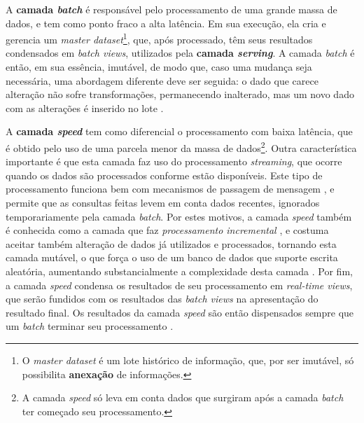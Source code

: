 A \textbf{camada \textit{batch}} é responsável pelo processamento de uma grande
massa de dados, e tem como ponto fraco a alta latência. Em sua execução, ela
cria e gerencia um \textit{master dataset}\footnote{O \textit{master dataset} é um lote
histórico de informação, que, por ser imutável, só possibilita \textbf{anexação}
de informações.}, que, após processado, têm seus resultados condensados em
\textit{batch views}, utilizados pela \textbf{camada \textit{serving}}.
A camada \textit{batch} é então, em sua essência, imutável, de modo que, caso
uma mudança seja necessária, uma abordagem diferente deve ser seguida: o dado
que carece alteração não sofre transformações, permanecendo inalterado, mas um
novo dado com as alterações é inserido no lote \cite{marz2015}.

A \textbf{camada \textit{speed}} tem como diferencial o processamento com baixa
latência, que é obtido pelo uso de uma parcela menor da massa de dados\footnote{
A camada \textit{speed} só leva em conta dados que surgiram após a camada
\textit{batch} ter começado seu processamento.}. Outra característica importante
é que esta camada faz uso do processamento \textit{streaming}, que ocorre
quando os dados são processados conforme estão disponíveis. Este tipo de
processamento funciona bem com mecanismos de passagem de mensagem
\cite{marz2015}, e permite que as consultas feitas levem em conta dados
recentes, ignorados temporariamente pela camada \textit{batch}. Por estes
motivos, a camada \textit{speed} também é conhecida como a camada que faz
\textit{processamento incremental} \cite{marz2015}, e costuma aceitar também
alteração de dados já utilizados e processados, tornando esta camada mutável,
o que força o uso de um banco de dados que suporte escrita aleatória,
aumentando substancialmente a complexidade desta camada \cite{marz2015}. Por
fim, a camada \textit{speed} condensa os resultados de seu processamento em
\textit{real-time views}, que serão fundidos com os resultados das
\textit{batch views} na apresentação do resultado final. Os resultados da
camada \textit{speed} são então dispensados sempre que um \textit{batch}
terminar seu processamento \cite{marz2015}.

